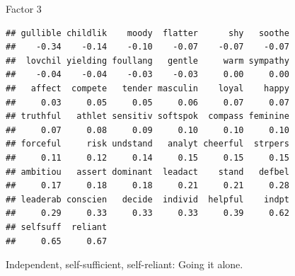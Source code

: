 \begin{frame}[fragile]{Factor 3}
  
  {\small
\begin{knitrout}
\color{fgcolor}\begin{kframe}
\begin{alltt}
\hlstd{mylist[[}\hlstd{]]}
\end{alltt}
\begin{verbatim}
## gullible childlik    moody  flatter      shy   soothe 
##    -0.34    -0.14    -0.10    -0.07    -0.07    -0.07 
##  lovchil yielding foullang   gentle     warm sympathy 
##    -0.04    -0.04    -0.03    -0.03     0.00     0.00 
##   affect  compete   tender masculin    loyal    happy 
##     0.03     0.05     0.05     0.06     0.07     0.07 
## truthful   athlet sensitiv softspok  compass feminine 
##     0.07     0.08     0.09     0.10     0.10     0.10 
## forceful     risk undstand   analyt cheerful  strpers 
##     0.11     0.12     0.14     0.15     0.15     0.15 
## ambitiou   assert dominant  leadact    stand   defbel 
##     0.17     0.18     0.18     0.21     0.21     0.28 
## leaderab conscien   decide  individ  helpful    indpt 
##     0.29     0.33     0.33     0.33     0.39     0.62 
## selfsuff  reliant 
##     0.65     0.67
\end{verbatim}
\end{kframe}
\end{knitrout}
}

Independent, self-sufficient, self-reliant: Going it alone.

\end{frame}
